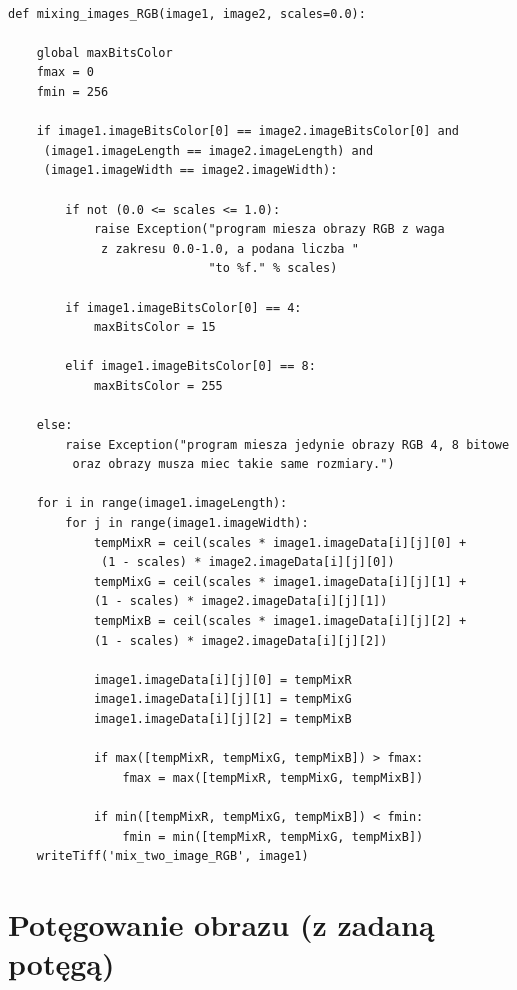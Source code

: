 \documentclass[magisterska,openany]{pracadypl}
\begin{document}
\lstset{language=Python}
\vspace{0.25cm}
\begin{lstlisting}[caption={Mieszanie obrazów z okreslonym współczynnikiem}]

def mixing_images_RGB(image1, image2, scales=0.0):

    global maxBitsColor
    fmax = 0
    fmin = 256

    if image1.imageBitsColor[0] == image2.imageBitsColor[0] and
     (image1.imageLength == image2.imageLength) and
     (image1.imageWidth == image2.imageWidth):

        if not (0.0 <= scales <= 1.0):
            raise Exception("program miesza obrazy RGB z waga
             z zakresu 0.0-1.0, a podana liczba "
                            "to %f." % scales)

        if image1.imageBitsColor[0] == 4:
            maxBitsColor = 15

        elif image1.imageBitsColor[0] == 8:
            maxBitsColor = 255

    else:
        raise Exception("program miesza jedynie obrazy RGB 4, 8 bitowe
         oraz obrazy musza miec takie same rozmiary.")

    for i in range(image1.imageLength):
        for j in range(image1.imageWidth):
            tempMixR = ceil(scales * image1.imageData[i][j][0] +
             (1 - scales) * image2.imageData[i][j][0])
            tempMixG = ceil(scales * image1.imageData[i][j][1] + 
            (1 - scales) * image2.imageData[i][j][1])
            tempMixB = ceil(scales * image1.imageData[i][j][2] + 
            (1 - scales) * image2.imageData[i][j][2])

            image1.imageData[i][j][0] = tempMixR
            image1.imageData[i][j][1] = tempMixG
            image1.imageData[i][j][2] = tempMixB

            if max([tempMixR, tempMixG, tempMixB]) > fmax:
                fmax = max([tempMixR, tempMixG, tempMixB])

            if min([tempMixR, tempMixG, tempMixB]) < fmin:
                fmin = min([tempMixR, tempMixG, tempMixB])
    writeTiff('mix_two_image_RGB', image1)

\end{lstlisting}
\newpage

\section{Potęgowanie obrazu (z zadaną potęgą)}
\end{document}
